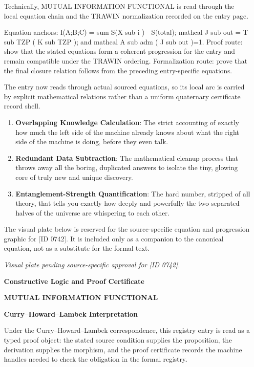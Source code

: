 Technically, MUTUAL INFORMATION FUNCTIONAL is read through the local equation chain and the TRAWIN normalization recorded on the entry page.

Equation anchors: I(A;B;C) = sum S(X sub i ) - S(total); mathcal J sub out = T sub TZP ( K sub TZP ); and mathcal A sub adm ( J sub out )=1. Proof route: show that the stated equations form a coherent progression for the entry and remain compatible under the TRAWIN ordering. Formalization route: prove that the final closure relation follows from the preceding entry-specific equations.

The entry now reads through actual sourced equations, so its local arc is carried by explicit mathematical relations rather than a uniform quaternary certificate record shell.
\endgroup

\begin{enumerate}[leftmargin=1.6em,itemsep=6pt,topsep=4pt]
\item \textbf{Overlapping Knowledge Calculation}: The strict accounting of exactly how much the left side of the machine already knows about what the right side of the machine is doing, before they even talk.
\item \textbf{Redundant Data Subtraction}: The mathematical cleanup process that throws away all the boring, duplicated answers to isolate the tiny, glowing core of truly new and unique discovery.
\item \textbf{Entanglement-Strength Quantification}: The hard number, stripped of all theory, that tells you exactly how deeply and powerfully the two separated halves of the universe are whispering to each other.
\end{enumerate}

\begingroup\footnotesize\sloppy
The visual plate below is reserved for the source-specific equation and progression graphic for [ID 0742]. It is included only as a companion to the canonical equation, not as a substitute for the formal text.
\par\endgroup
\begingroup\footnotesize\itshape
Visual plate pending source-specific approval for [ID 0742].
\par\endgroup

\clearpage
\begingroup\tzpsupportsetup
\noindent\textbf{\fontsize{10.8pt}{12.8pt}\selectfont [ID 0742] Constructive Logic and Proof Certificate}\par
\noindent\textbf{\fontsize{10pt}{12pt}\selectfont MUTUAL INFORMATION FUNCTIONAL}\par
\vspace{0.45em}
\begingroup
\footnotesize
\setlength{\parskip}{0.22em}
\setlength{\parindent}{0pt}
\noindent\textbf{Curry--Howard--Lambek Interpretation}\par
Under the Curry--Howard--Lambek correspondence, this registry entry is read as a typed proof
object: the stated source condition supplies the proposition, the derivation supplies the
morphism, and the proof certificate records the machine handles needed to check the obligation
in the formal registry.

